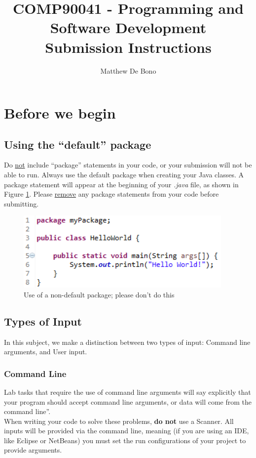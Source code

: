 \documentclass[]{article}
\title{COMP90041 - Programming and Software Development \\ Submission Instructions}
\author{Matthew De Bono}
\begin{document}
\maketitle

\section{Before we begin}
\subsection{Using the ``default'' package}
Do \underline{not} include ``package'' statements in your code, or your submission will not be able to run. Always use the default package when creating your Java classes. A package statement will appear at the beginning of your \textit{.java} file, as shown in Figure \ref{fig:package}. Please \underline{remove} any package statements from your code before submitting.

\begin{figure}[!h]
	\centering
	\includegraphics[width=300pt]{Images/Package}
	\caption{Use of a non-default package; please don't do this}
	\label{fig:package}
\end{figure}

\subsection{Types of Input}
In this subject, we make a distinction between two types of input: Command line arguments, and User input.

\subsubsection{Command Line}
Lab tasks that require the use of command line arguments will say explicitly that your program should accept command line arguments, or data will come from the command line''.\\

When writing your code to solve these problems, \textbf{do not} use a Scanner. All inputs will be provided via the command line, meaning (if you are using an IDE, like Eclipse or NetBeans) you must set the run configurations of your project to provide arguments.\\
\end{document}
